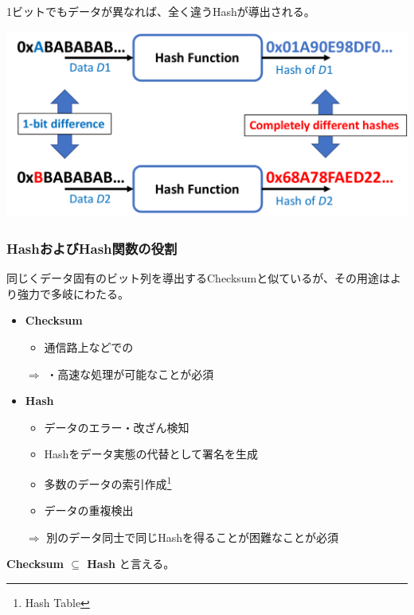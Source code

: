 \documentclass[12pt,dvipdfmx]{beamer}
\begin{document}
\begin{frame}
 1ビットでもデータが異なれば、全く違うHashが導出される。
\begin{center}
 \includegraphics[width=0.8\linewidth]{Figs/hash-flow02.pdf}
\end{center}
\end{frame}

\begin{frame}
\small
\frametitle{HashおよびHash関数の役割}
同じくデータ固有のビット列を導出するChecksumと似ているが、その用途はより強力で多岐にわたる。

\begin{itemize}
 \item \textbf{Checksum}
\begin{itemize}
 \item 通信路上などでの
\end{itemize}
$\Rightarrow$ ・高速な処理が可能なことが必須
 \item \textbf{Hash}
\begin{itemize}
 \item \alert{データのエラー・改ざん検知}
 \item \alert{Hashをデータ実態の代替として署名を生成}
 \item 多数のデータの索引作成\footnote[frame]{Hash Table} 
 \item データの重複検出
\end{itemize}
$\Rightarrow$ \alert{別のデータ同士で同じHashを得ることが困難}なことが必須
\end{itemize}

\textbf{Checksum $\subseteq$ Hash} と言える。
\end{frame}
\end{document}
